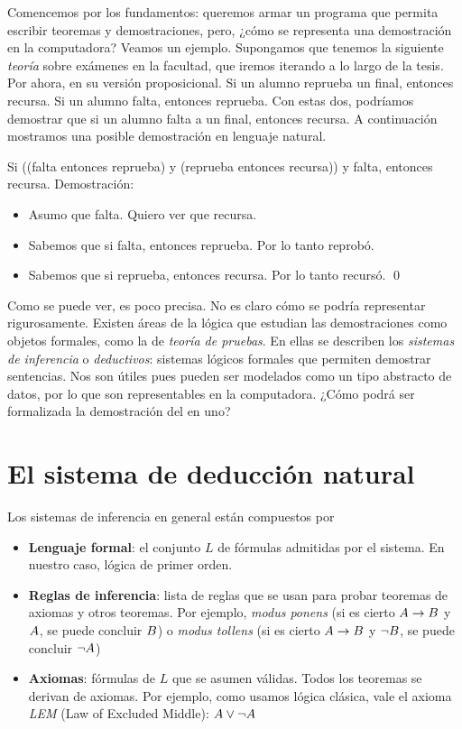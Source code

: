 Comencemos por los fundamentos: queremos armar un programa que permita escribir
teoremas y demostraciones, pero, ¿cómo se representa una demostración en la
computadora? Veamos un ejemplo. Supongamos que tenemos la
siguiente \textit{teoría} sobre exámenes en la facultad, que iremos iterando a
lo largo de la tesis. Por ahora, en su versión proposicional. Si un alumno
reprueba un final, entonces recursa. Si un alumno falta, entonces reprueba. Con
estas dos, podríamos demostrar que si un alumno falta a un final, entonces
recursa. A continuación mostramos una posible demostración en lenguaje natural.

\begin{ejemplo}\label{nd:ex:exam}
    Si ((falta entonces reprueba) y (reprueba entonces recursa)) y falta, entonces recursa. Demostración:
\begin{itemize}
    \item Asumo que falta. Quiero ver que recursa.
    \item Sabemos que si falta, entonces reprueba. Por lo tanto reprobó.
    \item Sabemos que si reprueba, entonces recursa. Por lo tanto recursó. \qed
\end{itemize}
\end{ejemplo}

Como se puede ver, es poco precisa. No es claro cómo se podría representar
rigurosamente. Existen áreas de la lógica que estudian las demostraciones como
objetos formales, como la de \textit{teoría de pruebas}. En ellas se describen
los \textit{sistemas de inferencia} o \textit{deductivos}: sistemas lógicos
formales que permiten demostrar sentencias. Nos son útiles pues pueden ser
modelados como un tipo abstracto de datos, por lo que son representables en la
computadora. ¿Cómo podrá ser formalizada la demostración del
 en uno?

\section{El sistema de deducción natural}

Los sistemas de inferencia en general están compuestos por

\begin{itemize}
    \item \textbf{Lenguaje formal}: el conjunto $L$ de fórmulas admitidas por
    el sistema. En nuestro caso, lógica de primer orden.
    \item \textbf{Reglas de inferencia}: lista de reglas que se usan para probar
    teoremas de axiomas y otros teoremas. Por ejemplo, \textit{modus ponens} (si
    es cierto $A \to B$ y $A$, se puede concluir $B$) o
    \textit{modus tollens} (si es cierto $A \to B$ y $\neg
    B$, se puede concluir $\neg A$)
    \item \textbf{Axiomas}: fórmulas de $L$ que se asumen válidas. Todos los
    teoremas se derivan de axiomas. Por ejemplo, como usamos lógica clásica,
    vale el axioma \textit{LEM} (Law of Excluded Middle): $A \vee \neg A$
\end{itemize}

